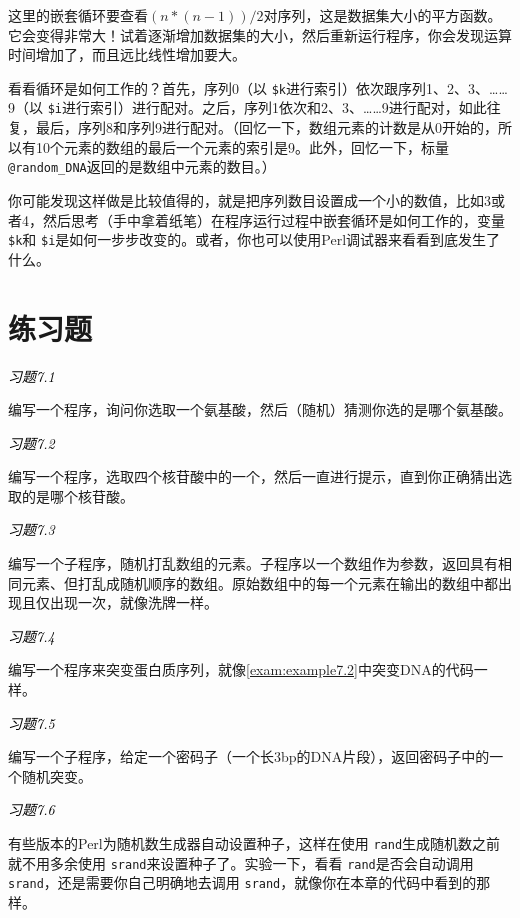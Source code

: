 这里的嵌套循环要查看$(n * (n-1)) / 2$对序列，这是数据集大小的平方函数。它会变得非常大！试着逐渐增加数据集的大小，然后重新运行程序，你会发现运算时间增加了，而且远比线性增加要大。

看看循环是如何工作的？首先，序列0（以 \verb|$k|进行索引）依次跟序列1、2、3、……9（以 \verb|$i|进行索引）进行配对。之后，序列1依次和2、3、……9进行配对，如此往复，最后，序列8和序列9进行配对。（回忆一下，数组元素的计数是从0开始的，所以有10个元素的数组的最后一个元素的索引是9。此外，回忆一下，标量 \verb|@random_DNA|返回的是数组中元素的数目。）

你可能发现这样做是比较值得的，就是把序列数目设置成一个小的数值，比如3或者4，然后思考（手中拿着纸笔）在程序运行过程中嵌套循环是如何工作的，变量 \verb|$k|和 \verb|$i|是如何一步步改变的。或者，你也可以使用Perl调试器来看看到底发生了什么。

\section{练习题}
\textcolor{black}{\textit{习题7.1}}
\begin{adjustwidth}{4em}{}
编写一个程序，询问你选取一个氨基酸，然后（随机）猜测你选的是哪个氨基酸。
\end{adjustwidth}

\textcolor{black}{\textit{习题7.2}}
\begin{adjustwidth}{4em}{}
编写一个程序，选取四个核苷酸中的一个，然后一直进行提示，直到你正确猜出选取的是哪个核苷酸。
\end{adjustwidth}

\textcolor{black}{\textit{习题7.3}}
\begin{adjustwidth}{4em}{}
编写一个子程序，随机打乱数组的元素。子程序以一个数组作为参数，返回具有相同元素、但打乱成随机顺序的数组。原始数组中的每一个元素在输出的数组中都出现且仅出现一次，就像洗牌一样。
\end{adjustwidth}

\textcolor{black}{\textit{习题7.4}}
\begin{adjustwidth}{4em}{}
编写一个程序来突变蛋白质序列，就像\autoref{exam:example7.2}中突变DNA的代码一样。
\end{adjustwidth}

\textcolor{black}{\textit{习题7.5}}
\begin{adjustwidth}{4em}{}
编写一个子程序，给定一个密码子（一个长3bp的DNA片段），返回密码子中的一个随机突变。
\end{adjustwidth}

\textcolor{black}{\textit{习题7.6}}
\begin{adjustwidth}{4em}{}
有些版本的Perl为随机数生成器自动设置种子，这样在使用 \verb|rand|生成随机数之前就不用多余使用 \verb|srand|来设置种子了。实验一下，看看 \verb|rand|是否会自动调用 \verb|srand|，还是需要你自己明确地去调用 \verb|srand|，就像你在本章的代码中看到的那样。
\end{adjustwidth}


